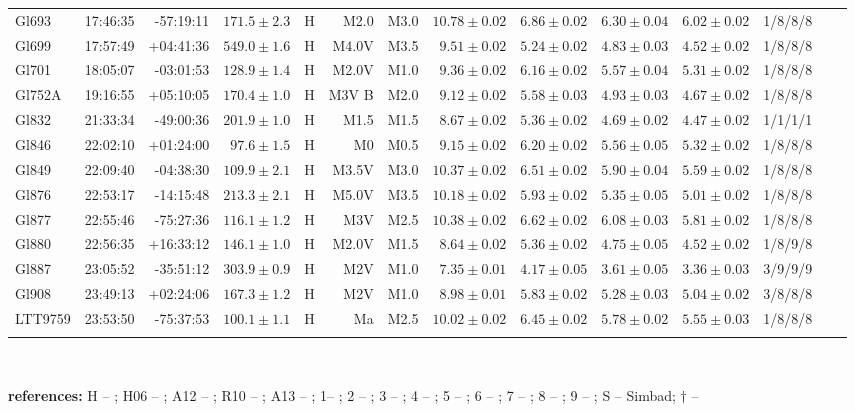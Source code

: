 \documentclass[referee]{aa}
\begin{document}
\begin{table}[h!]
{\begin{tabular}{ l r r r c r r r r r r r r r}
Gl693 & 17:46:35 & -57:19:11 & $171.5 \pm  2.3$ & H & M2.0 & M3.0 &  $10.78 \pm 0.02$ & $6.86 \pm 0.02$ & $6.30 \pm 0.04$ & $6.02 \pm 0.02$ & 1/8/8/8 \\
Gl699 & 17:57:49 & +04:41:36 & $549.0 \pm  1.6$ & H & M4.0V & M3.5 &  $9.51 \pm 0.02$ & $5.24 \pm 0.02$ & $4.83 \pm 0.03$ & $4.52 \pm 0.02$ & 1/8/8/8 \\
Gl701 & 18:05:07 & -03:01:53 & $128.9 \pm  1.4$ & H & M2.0V & M1.0 &  $9.36 \pm 0.02$ & $6.16 \pm 0.02$ & $5.57 \pm 0.04$ & $5.31 \pm 0.02$ & 1/8/8/8 \\
Gl752A & 19:16:55 & +05:10:05 & $170.4 \pm  1.0$ & H & M3V B & M2.0 &  $9.12 \pm 0.02$ & $5.58 \pm 0.03$ & $4.93 \pm 0.03$ & $4.67 \pm 0.02$ & 1/8/8/8 \\
Gl832 & 21:33:34 & -49:00:36 & $201.9 \pm  1.0$ & H & M1.5 & M1.5 &  $8.67 \pm 0.02$ & $5.36 \pm 0.02$ & $4.69 \pm 0.02$ & $4.47 \pm 0.02$ & 1/1/1/1 \\
Gl846 & 22:02:10 & +01:24:00 & $97.6 \pm  1.5$ & H & M0 & M0.5 &  $9.15 \pm 0.02$ & $6.20 \pm 0.02$ & $5.56 \pm 0.05$ & $5.32 \pm 0.02$ & 1/8/8/8 \\
Gl849 & 22:09:40 & -04:38:30 & $109.9 \pm  2.1$ & H & M3.5V & M3.0 &  $10.37 \pm 0.02$ & $6.51 \pm 0.02$ & $5.90 \pm 0.04$ & $5.59 \pm 0.02$ & 1/8/8/8 \\
Gl876 & 22:53:17 & -14:15:48 & $213.3 \pm  2.1$ & H & M5.0V & M3.5 &  $10.18 \pm 0.02$ & $5.93 \pm 0.02$ & $5.35 \pm 0.05$ & $5.01 \pm 0.02$ & 1/8/8/8 \\
Gl877 & 22:55:46 & -75:27:36 & $116.1 \pm  1.2$ & H & M3V & M2.5 &  $10.38 \pm 0.02$ & $6.62 \pm 0.02$ & $6.08 \pm 0.03$ & $5.81 \pm 0.02$ & 1/8/8/8 \\
Gl880 & 22:56:35 & +16:33:12 & $146.1 \pm  1.0$ & H & M2.0V & M1.5 &  $8.64 \pm 0.02$ & $5.36 \pm 0.02$ & $4.75 \pm 0.05$ & $4.52 \pm 0.02$ & 1/8/9/8 \\
Gl887 & 23:05:52 & -35:51:12 & $303.9 \pm  0.9$ & H & M2V & M1.0 &  $7.35 \pm 0.01$ & $4.17 \pm 0.05$ & $3.61 \pm 0.05$ & $3.36 \pm 0.03$ & 3/9/9/9 \\
Gl908 & 23:49:13 & +02:24:06 & $167.3 \pm  1.2$ & H & M2V & M1.0 &  $8.98 \pm 0.01$ & $5.83 \pm 0.02$ & $5.28 \pm 0.03$ & $5.04 \pm 0.02$ & 3/8/8/8 \\
LTT9759 & 23:53:50 & -75:37:53 & $100.1 \pm  1.1$ & H & Ma & M2.5 &  $10.02 \pm 0.02$ & $6.45 \pm 0.02$ & $5.78 \pm 0.02$ & $5.55 \pm 0.03$ & 1/8/8/8 \\
\\
\hline
\hline
\end{tabular}
}
{
\\
\raggedright{
\textbf{references:} H -- \citep{van-Leeuwen-2007}; H06 -- \citet{Henry-2006}; A12 -- \citet{Anglada-Escude-2012}; R10 -- \citet{Riedel-2010}; A13 -- \citet{Anglada-Escude-2013}; 1-- \citet{Koen-2010}; 2 -- \citet{Henden-2009,Henden-2012}; 3 -- \citet{Perryman-1997}; 4 -- \citet{Weis-1993}; 5 -- \citet{Laing-1989}; 6 -- \citet{Fabricius-2002}; 7 -- \citet{Dawson-1992}; 8 -- \citet{Skrutskie-2006}; 9 -- \citet{Leggett-1992}; S -- Simbad; $\dagger$ -- \citet{Hawley-1997} \\
}
}
\end{table}
\end{document}
